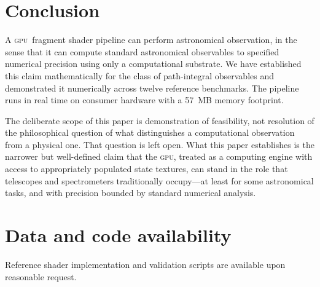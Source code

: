 \documentclass[11pt,twocolumn,a4paper]{article}
\theoremstyle{definition}
\theoremstyle{remark}
\newcommand{\gpu}{\textsc{gpu}}
\begin{document}
\section{Conclusion}
\label{sec:conclusion}

A \gpu\ fragment shader pipeline can perform astronomical observation, in the sense that it can compute standard astronomical observables to specified numerical precision using only a computational substrate. We have established this claim mathematically for the class of path-integral observables and demonstrated it numerically across twelve reference benchmarks. The pipeline runs in real time on consumer hardware with a 57~MB memory footprint.

The deliberate scope of this paper is demonstration of feasibility, not resolution of the philosophical question of what distinguishes a computational observation from a physical one. That question is left open. What this paper establishes is the narrower but well-defined claim that the \gpu, treated as a computing engine with access to appropriately populated state textures, can stand in the role that telescopes and spectrometers traditionally occupy---at least for some astronomical tasks, and with precision bounded by standard numerical analysis.

\section*{Data and code availability}
Reference shader implementation and validation scripts are available upon reasonable request.



\end{document}
